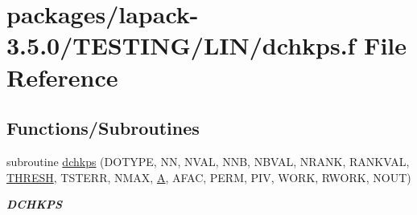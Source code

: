 \hypertarget{dchkps_8f}{}\section{packages/lapack-\/3.5.0/\+T\+E\+S\+T\+I\+N\+G/\+L\+I\+N/dchkps.f File Reference}
\label{dchkps_8f}
\subsection*{Functions/\+Subroutines}
\begin{DoxyCompactItemize}
\item 
subroutine \hyperlink{group__double__lin_ga90403fbe2988516f5125763f37b0370c}{dchkps} (D\+O\+T\+Y\+P\+E, N\+N, N\+V\+A\+L, N\+N\+B, N\+B\+V\+A\+L, N\+R\+A\+N\+K, R\+A\+N\+K\+V\+A\+L, \hyperlink{zlaqgs_8c_a0656018abfc9fa2821827415f5d5ea57}{T\+H\+R\+E\+S\+H}, T\+S\+T\+E\+R\+R, N\+M\+A\+X, \hyperlink{classA}{A}, A\+F\+A\+C, P\+E\+R\+M, P\+I\+V, W\+O\+R\+K, R\+W\+O\+R\+K, N\+O\+U\+T)
\begin{DoxyCompactList}\small\item\em {\bfseries D\+C\+H\+K\+P\+S} \end{DoxyCompactList}\end{DoxyCompactItemize}
